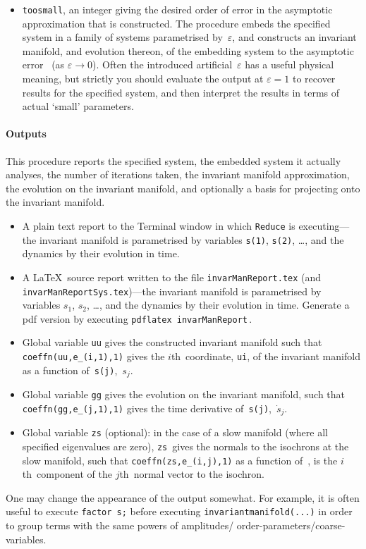 \documentclass[11pt,a5paper]{article}
\def\eps{\varepsilon}
\begin{document}
\begin{itemize}
\item \verb|toosmall|, an integer giving the desired order
of error in the asymptotic approximation that is
constructed.  The procedure embeds the specified system in a
family of systems parametrised by~\(\eps\), and constructs
an invariant manifold, and evolution thereon, of the
embedding system to the asymptotic error~\Ord{\eps^{\tt
toosmall}} (as \(\eps\to0\)). Often the introduced
artificial~\(\eps\) has a useful physical meaning, but
strictly you should evaluate the output at \(\eps=1\) to
recover results for the specified system, and then interpret
the results in terms of actual `small' parameters.

\end{itemize}



\paragraph{Outputs}  This procedure reports the specified
system, the embedded system it actually analyses, the number
of iterations taken, the invariant manifold approximation,
the evolution on the invariant manifold, and optionally a
basis for projecting onto the invariant manifold.
\begin{itemize}
\item A plain text report to the Terminal window in which
\verb|Reduce| is executing---the invariant manifold is
parametrised by variables \verb|s(1)|, \verb|s(2)|, \ldots,
and the dynamics by their evolution in time.

\item A \LaTeX\ source report written to the file
\verb|invarManReport.tex| (and
\verb|invarManReportSys.tex|)---the invariant manifold is
parametrised by variables \(s_1\), \(s_2\), \ldots, and the
dynamics by their evolution in time.  Generate a pdf version
by executing \verb|pdflatex invarManReport|\,.

\item Global variable \verb|uu| gives the constructed 
invariant manifold such that \verb|coeffn(uu,e_(i,1),1)| 
gives the \(i\)th~coordinate, \verb|ui|, of the invariant 
manifold as a function of~\verb|s(j)|,~\(s_j\).

\item Global variable \verb|gg| gives the evolution on the 
invariant manifold, such that \verb|coeffn(gg,e_(j,1),1)| 
gives the time derivative of~\verb|s(j)|,~\(\dot s_j\).

\item Global variable \verb|zs| (optional): in the case of 
a slow manifold (where all specified eigenvalues are zero), 
\verb|zs|~gives the normals to the isochrons at the slow 
manifold, such that \verb|coeffn(zs,e_(i,j),1)| as a 
function of~\sv, is the \(i\)th~component of the 
\(j\)th~normal vector to the isochron.

\end{itemize}
One may change the appearance of the output somewhat. For
example, it is often useful to execute  \verb|factor s;|
before executing \verb|invariantmanifold(...)| in order to
group terms with the same powers of amplitudes\slash
order-parameters\slash coarse-variables.
\end{document}
